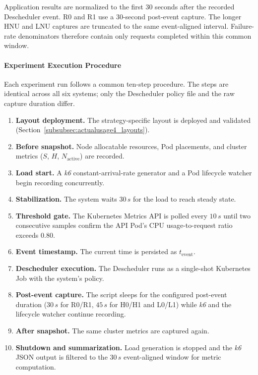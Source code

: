 Application results are normalized to the first \(30\) seconds after the recorded Descheduler event. R0 and R1 use a \(30\)-second post-event capture. The longer HNU and LNU captures are truncated to the same event-aligned interval. Failure-rate denominators therefore contain only requests completed within this common window.

\paragraph{Experiment Execution Procedure}
\label{subsubsec:actualusage4_procedure}

Each experiment run follows a common ten-step procedure. The steps are identical across all six systems; only the Descheduler policy file and the raw capture duration differ.

\begin{enumerate}
    \item \textbf{Layout deployment.} The strategy-specific layout is deployed and validated (Section~\ref{subsubsec:actualusage4_layouts}).
    \item \textbf{Before snapshot.} Node allocatable resources, Pod placements, and cluster metrics (\(S\), \(H\), \(N_{\text{active}}\)) are recorded.
    \item \textbf{Load start.} A \textit{k6} constant-arrival-rate generator and a Pod lifecycle watcher begin recording concurrently.
    \item \textbf{Stabilization.} The system waits \(30\,s\) for the load to reach steady state.
    \item \textbf{Threshold gate.} The Kubernetes Metrics API is polled every \(10\,s\) until two consecutive samples confirm the API Pod's CPU usage-to-request ratio exceeds \(0.80\).
    \item \textbf{Event timestamp.} The current time is persisted as \(t_{\text{event}}\).
    \item \textbf{Descheduler execution.} The Descheduler runs as a single-shot Kubernetes Job with the system's policy.
    \item \textbf{Post-event capture.} The script sleeps for the configured post-event duration (\(30\,s\) for R0/R1, \(45\,s\) for H0/H1 and L0/L1) while \textit{k6} and the lifecycle watcher continue recording.
    \item \textbf{After snapshot.} The same cluster metrics are captured again.
    \item \textbf{Shutdown and summarization.} Load generation is stopped and the \textit{k6} JSON output is filtered to the \(30\,s\) event-aligned window for metric computation.
\end{enumerate}

